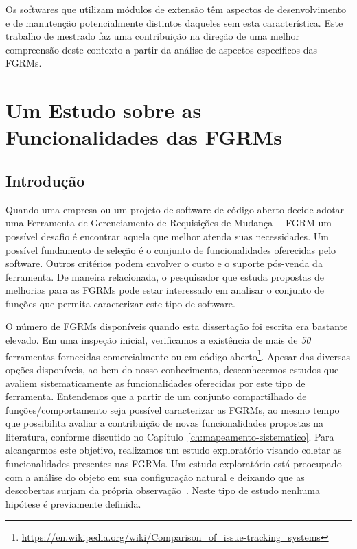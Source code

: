 Os softwares que utilizam módulos de extensão têm aspectos de desenvolvimento e
de manutenção potencialmente distintos daqueles sem esta característica. Este
trabalho de mestrado faz uma contribuição na direção de uma melhor compreensão
deste contexto a partir da análise de aspectos específicos das FGRMs.

\section{Um Estudo sobre as Funcionalidades das FGRMs}
\label{sec:caracterizacao_ferramentas}

\subsection{Introdução}
\label{subsec:caracterizacao_intro}
Quando uma empresa ou um projeto de software de código aberto decide adotar uma
Ferramenta de Gerenciamento de Requisições de Mudança~-~FGRM um possível desafio
é encontrar aquela que melhor atenda suas necessidades. Um possível fundamento
de seleção é o conjunto de funcionalidades oferecidas pelo software. Outros
critérios podem envolver o custo e o suporte pós-venda da ferramenta. De maneira
relacionada, o pesquisador que estuda propostas de melhorias para as FGRMs pode
estar interessado em analisar o conjunto de funções que permita caracterizar
este tipo de software.

O número de FGRMs disponíveis quando esta dissertação foi escrita era bastante
elevado. Em uma inspeção inicial, verificamos a existência de mais de
\textit{50} ferramentas fornecidas comercialmente ou em código
aberto\footnote{\url{https://en.wikipedia.org/wiki/Comparison_of_issue-tracking_systems}}.
Apesar das diversas opções disponíveis, ao bem do nosso conhecimento,
desconhecemos estudos que avaliem sistematicamente as funcionalidades oferecidas
por este tipo de ferramenta. Entendemos que a partir de um conjunto
compartilhado de funções/comportamento seja possível caracterizar as FGRMs, ao
mesmo tempo que possibilita avaliar a contribuição de novas funcionalidades
propostas na li\-te\-ra\-tu\-ra, conforme discutido no
Capítulo~\ref{ch:mapeamento-sistematico}. Para alcançarmos este objetivo,
realizamos um estudo exploratório visando coletar as funcionalidades presentes
nas FGRMs. Um estudo exploratório está preocupado com a análise do objeto em
sua configuração natural e deixando que as descobertas surjam da própria
observação~\cite{wohlin2012experimentation}. Neste tipo de estudo nenhuma
hipótese é previamente definida.

